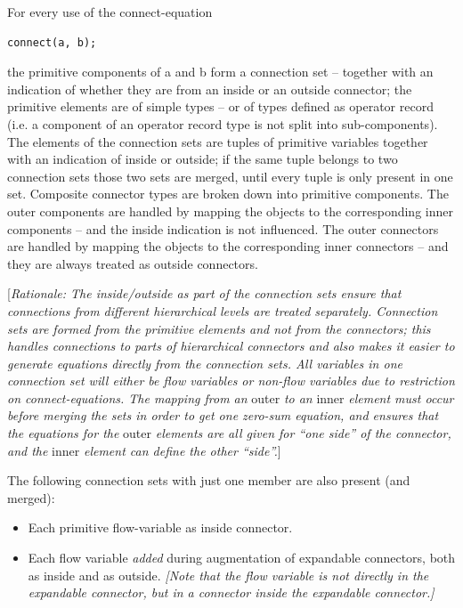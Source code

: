 \documentclass[10pt,a4paper]{report}
\begin{document}
For every use of the connect-equation
\begin{lstlisting}[language=modelica]
connect(a, b);
\end{lstlisting}

the primitive components of a and b form a connection set -- together
with an indication of whether they are from an inside or an outside
connector; the primitive elements are of simple types -- or of types
defined as operator record (i.e. a component of an operator record type
is not split into sub-components). The elements of the connection sets
are tuples of primitive variables together with an indication of inside
or outside; if the same tuple belongs to two connection sets those two
sets are merged, until every tuple is only present in one set. Composite
connector types are broken down into primitive components. The outer
components are handled by mapping the objects to the corresponding inner
components -- and the inside indication is not influenced. The outer
connectors are handled by mapping the objects to the corresponding inner
connectors -- and they are always treated as outside connectors.

{[}\emph{Rationale: The inside/outside as part of the connection sets
ensure that connections from different hierarchical levels are treated
separately. Connection sets are formed from the primitive elements and
not from the connectors; this handles connections to parts of
hierarchical connectors and also makes it easier to generate equations
directly from the connection sets. All variables in one connection set
will either be flow variables or non-flow variables due to restriction
on connect-equations. The mapping from an} outer \emph{to an} inner
\emph{element must occur before merging the sets in order to get one
zero-sum equation, and ensures that the equations for the} outer
\emph{elements are all given for ``one side'' of the connector, and the}
inner \emph{element can define the other ``side''.}{]}

The following connection sets with just one member are also present (and
merged):

\begin{itemize}
\item
  Each primitive flow-variable as inside connector.
\item
  Each flow variable \emph{added} during augmentation of expandable
  connectors, both as inside and as outside. \emph{{[}Note that the flow
  variable is not directly in the expandable connector, but in a
  connector inside the expandable connector.{]}}
\end{itemize}
\end{document}
